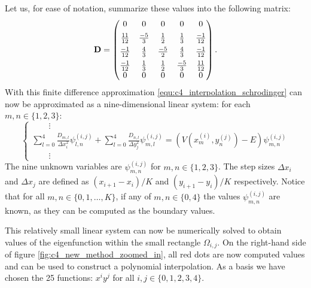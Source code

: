 Let us, for ease of notation, summarize these values into the following matrix:
$$
    \vb{D} = \begin{pmatrix}
        0                             & 0            & 0            & 0            & 0             \\
        \rule{0pt}{3ex} \frac{11}{12} & \frac{-5}{3} & \frac{1}{2}  & \frac{1}{3}  & \frac{-1}{12} \\
        \rule{0pt}{3ex} \frac{-1}{12} & \frac{4}{3}  & \frac{-5}{2} & \frac{4}{3}  & \frac{-1}{12} \\
        \rule{0pt}{3ex} \frac{-1}{12} & \frac{1}{3}  & \frac{1}{2}  & \frac{-5}{3} & \frac{11}{12} \\
        0                             & 0            & 0            & 0            & 0
    \end{pmatrix}\text{.}
$$
With this finite difference approximation \eqref{equ:c4_interpolation_schrodinger} can now be approximated as a nine-dimensional linear system: for each $m, n \in \{1,2,3\}$:
$$
    \begin{cases}
        \qquad\vdots                                                                                                                                                                                                 \\
        {\displaystyle \sum_{l=0}^4 \frac{D_{m, l}}{\Delta x_i^2}\psi^{(i,j)}_{l, n} + \sum_{l=0}^4 \frac{D_{n, l}}{\Delta y_j^2}\psi^{(i,j)}_{m, l} =  \left(V(x^{(i)}_m, y^{(j)}_n) - E\right)\psi^{(i,j)}_{m, n}} \\
        \qquad\vdots
    \end{cases}
$$
The nine unknown variables are $\psi^{(i, j)}_{m, n}$ for $m, n \in \{1,2,3\}$. The step sizes $\Delta x_i$ and $\Delta x_j$ are defined as $\left(x_{i+1} - x_{i}\right) / K$ and $\left(y_{i+1} - y_{i}\right) / K$ respectively. Notice that for all $m, n \in \{0,1,\dots, K\}$, if any of $m, n \in \{0, 4\}$ the values $\psi^{(i, j)}_{m, n}$ are known, as they can be computed as the boundary values.

This relatively small linear system can now be numerically solved to obtain values of the eigenfunction within the small rectangle $\Omega_{i,j}$. On the right-hand side of figure \ref{fig:c4_new_method_zoomed_in}, all red dots are now computed values and can be used to construct a polynomial interpolation. As a basis we have chosen the 25 functions: $x^i y^j$ for all $i,j \in \{0,1,2,3,4\}$.



